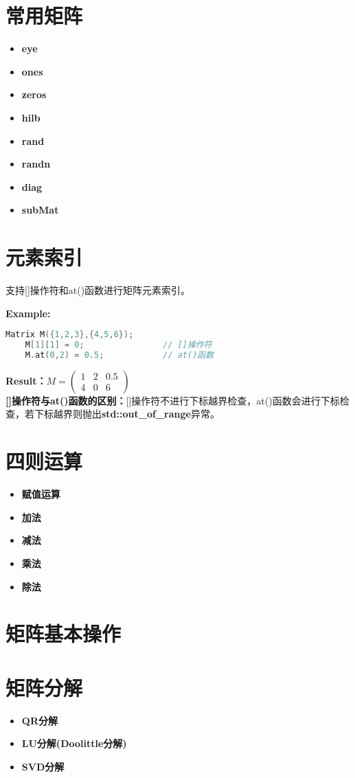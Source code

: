 \documentclass[UTF8]{ctexart}
\begin{document}
\section{常用矩阵}

\begin{itemize}
    \item \textbf{eye}
    \item \textbf{ones}
    \item \textbf{zeros}
    \item \textbf{hilb}
    \item \textbf{rand}
    \item \textbf{randn}
    \item \textbf{diag}
    \item \textbf{subMat}
\end{itemize}

\section{元素索引}
支持[]操作符和at()函数进行矩阵元素索引。

\textbf{Example:}
{
    \setmainfont{Consolas}
    \begin{lstlisting}[language=C++]
    Matrix M({1,2,3},{4,5,6});
    M[1][1] = 0;                // []操作符
    M.at(0,2) = 0.5;            // at()函数
    \end{lstlisting}
}

\textbf{Result：}$
M = \left(
\begin{matrix}
   1 & 2 & 0.5 \\
   4 & 0 & 6 
  \end{matrix}
\right)
$\\

\textbf{[]操作符与at()函数的区别：}[]操作符不进行下标越界检查，at()函数会进行下标检查，若下标越界则抛出\textbf{std::out\_of\_range}异常。

\section{四则运算}

\begin{itemize}
    \item \textbf{赋值运算}
    \item \textbf{加法}
    \item \textbf{减法}
    \item \textbf{乘法}
    \item \textbf{除法}
\end{itemize}

\section{矩阵基本操作}

\section{矩阵分解}

\begin{itemize}
    \item \textbf{QR分解}
    \item \textbf{LU分解(Doolittle分解)}
    \item \textbf{SVD分解}
\end{itemize}
\end{document}
